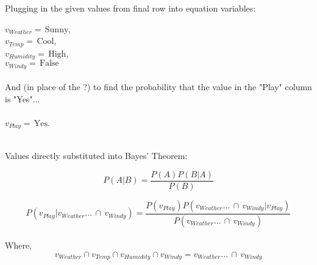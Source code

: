 \documentclass{article}
\begin{document}
\begin{center} Plugging in the given values from final row into equation variables:\end{center}
$v_{Weather} = \, \text{Sunny}$, \\ 
$v_{Temp} = \, \text{Cool}$, \\ 
$v_{Humidity} = \, \text{High}$, \\ 
$v_{Windy} = \, \text{False}$ \\ \\ 
And (in place of the ?) to find the probability that the value in the "Play" column is "Yes"... \\ \\
$v_{Play} = \, \text{Yes}$. \\ \\



\newcommand{\vand}{v_{Weather} \dots \, \cap \, v_{Windy}}
\newcommand{\vprobs}{P \left( v_{Weather}\right) \dots \, \, P \left( v_{Windy} \right) }
\newcommand{\vbarprobs}{P \left( v_{Weather} | v_{Play} \right) \dots \, \, P \left( v_{Windy} | v_{Play} \right) }


%
%

\begin{center} Values directly substituted into Bayes' Theorem: \end{center}

\begin{equation} \tag{2}
		\nonumber P \left( A | B \right) = \frac{ P  \left( A  \right) P \left( B | A \right)}{P \left( B \right)}
\end{equation}

\begin{equation}
		\nonumber P \left( v_{Play} | \vand{} \right) 
		= \frac{ P  \left(  v_{Play} \right) P \left( \vand{} |  v_{Play} \right)}{P \left(  \vand{} \right)} 
\end{equation} \\

Where,
\begin{equation}
 \nonumber v_{Weather} \cap v_{Temp} \cap v_{Humidity} \cap v_{Windy} = \vand{}
\end{equation} \\ \\
\end{document}
